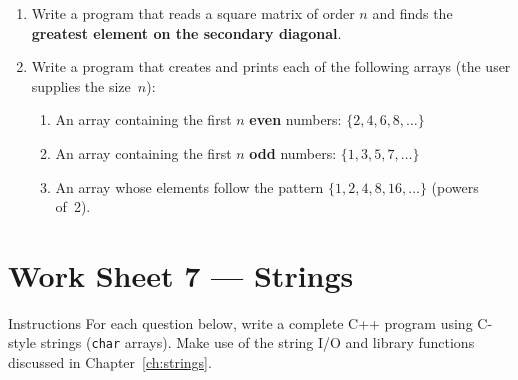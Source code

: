 \begin{enumerate}[leftmargin=*, label=\textbf{Q\arabic*.}]
      \textit{Example:}
\begin{verbatim}
A = | 1  2  3  4 |    B = | 10 |
    | 5  6  7  8 |        | 26 |
    | 9 10 11 12 |        | 42 |
\end{verbatim}

\item Write a program that reads a square matrix of order $n$ and
      finds the \textbf{greatest element on the secondary diagonal}.

\item Write a program that creates and prints each of the following
      arrays (the user supplies the size~$n$):

      \begin{enumerate}[label=(\alph*)]
        \item An array containing the first $n$ \textbf{even} numbers:
              $\{2, 4, 6, 8, \ldots\}$
        \item An array containing the first $n$ \textbf{odd} numbers:
              $\{1, 3, 5, 7, \ldots\}$
        \item An array whose elements follow the pattern
              $\{1, 2, 4, 8, 16, \ldots\}$ (powers of~2).
      \end{enumerate}

\end{enumerate}

\newpage
\section{Work Sheet 7 --- Strings}
\label{ws:strings}

\begin{importantbox}{Instructions}
For each question below, write a complete C++ program using C-style
strings (\texttt{char} arrays).  Make use of the string I/O and
library functions discussed in Chapter~\ref{ch:strings}.
\end{importantbox}

